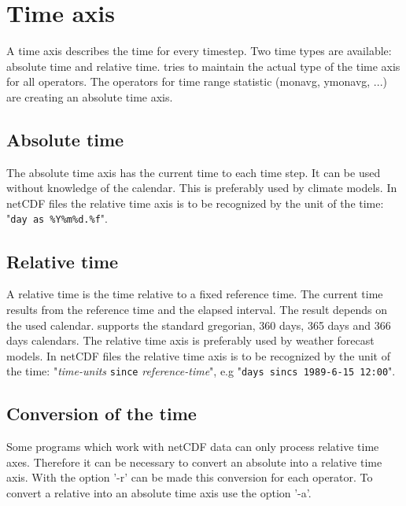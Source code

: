 \section{Time axis}

A time axis describes the time for every timestep.
Two time types are available: absolute time and relative time.
\CDO tries to maintain the actual type of the time axis for all operators.
The operators for time range statistic (monavg, ymonavg, ...) are
creating an absolute time axis.

\subsection{Absolute time}

The absolute time axis has the current time to each time step.
It can be used without knowledge of the calendar.
This is preferably used by climate models.
In netCDF files the relative time axis is to be recognized by the 
unit of the time: {"{\tt day as \%Y\%m\%d.\%f}"}.

\subsection{Relative time}

A relative time is the time relative to a fixed reference time.
The current time results from the reference time and the elapsed interval.
The result depends on the used calendar.
\CDO supports the standard gregorian, 360 days, 365 days and 366 days calendars.
The relative time axis is preferably used by weather forecast models.
In netCDF files the relative time axis is to be recognized by the 
unit of the time: {"{\it time-units} {\tt since} {\it reference-time}"},
e.g "{\tt days sincs 1989-6-15 12:00}".

\subsection{Conversion of the time}

Some programs which work with netCDF data can only process relative time axes.
Therefore it can be necessary to convert an absolute into a relative time axis.
With the \CDO option '-r' can be made this conversion for each operator.
To convert a relative into an absolute time axis use the \CDO option '-a'.

